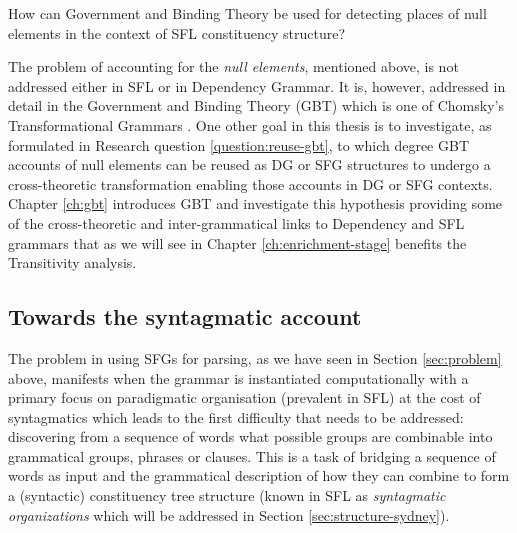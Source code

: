 \begin{question}\label{question:reuse-gbt}
    How can Government and Binding Theory be used for detecting places of null elements in the context of SFL constituency structure?
\end{question}


The problem of accounting for the \textit{null elements}, mentioned above, is not addressed either in SFL or in Dependency Grammar. It is, however, addressed in detail in the Government and Binding Theory (GBT) \citep{Chomsky81,Haegeman1991} which is one of Chomsky's Transformational Grammars \citep{Chomsky1957}. One other goal in this thesis is to investigate, as formulated in Research question \ref{question:reuse-gbt}, to which degree GBT accounts of null elements can be reused as DG or SFG structures to undergo a cross-theoretic transformation enabling those accounts in DG or SFG contexts. Chapter \ref{ch:gbt} introduces GBT and investigate this hypothesis providing some of the cross-theoretic and inter-grammatical links to Dependency and SFL grammars that as we will see in Chapter \ref{ch:enrichment-stage} benefits the Transitivity analysis.


\subsection{Towards the syntagmatic account}
\label{sec:syntagmatic-account}
The problem in using SFGs for parsing, as we have seen in Section \ref{sec:problem} above, manifests when the grammar is instantiated computationally with a primary focus on paradigmatic organisation (prevalent in SFL) at the cost of syntagmatics which leads to the first difficulty that needs to be addressed: discovering from a sequence of words what possible groups are combinable into grammatical groups, phrases or clauses. This is a task of bridging a sequence of words as input and the grammatical description of how they can combine to form a (syntactic) constituency tree structure (known in SFL as \textit{syntagmatic organizations} which will be addressed in Section \ref{sec:structure-sydney}). 

